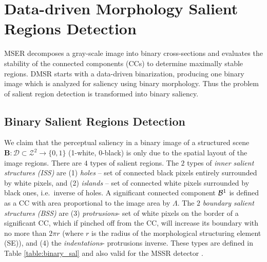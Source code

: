 \documentclass[conference,compsoc]{IEEEtran}
\def\B{{\mathbf B}}
\def\mcD{{\mathcal{D}}}
\begin{document}
\section{Data-driven Morphology Salient Regions Detection}
\label{sec:DMSR}


MSER decomposes a gray-scale image into binary cross-sections and evaluates the stability of the connected components (CCs) to determine maximally stable regions. DMSR starts with a data-driven binarization, producing one binary image which is analyzed for saliency using binary morphology. Thus the problem of salient region detection is transformed into binary saliency.

\subsection{Binary Salient Regions Detection}
\label{ssec:binary}
We claim that the perceptual saliency in a binary image of a structured scene 
 $\B: \mcD \subset \mathcal{Z}^2 \rightarrow \{0,1\}$ (1-white, 0-black)
is only due to the spatial layout of the image regions. 
There are  $4$ types of salient regions. The $2$ types of {\em inner salient structures (ISS)} are (1) {\em holes} -- set of connected black pixels entirely surrounded by white pixels, and (2) {\em islands} -- set of connected white pixels surrounded by black ones, i.e.~inverse of holes. A significant connected component ${\cal B}^1$ is defined as a CC with area proportional to the image area by $\Lambda$. 
The $2$ {\em boundary salient structures (BSS)} are (3) {\em protrusions}- set of white pixels on the border of a significant CC, which if pinched off from the CC, will increase its boundary with no more than $2\pi r$ (where $r$ is the radius of the morphological structuring element (SE)), and (4) the {\em indentations}- protrusions inverse. These types are defined in Table \ref{table:binary_sal} and also valid for the MSSR detector \cite{RangHumpb06}. 
\end{document}

